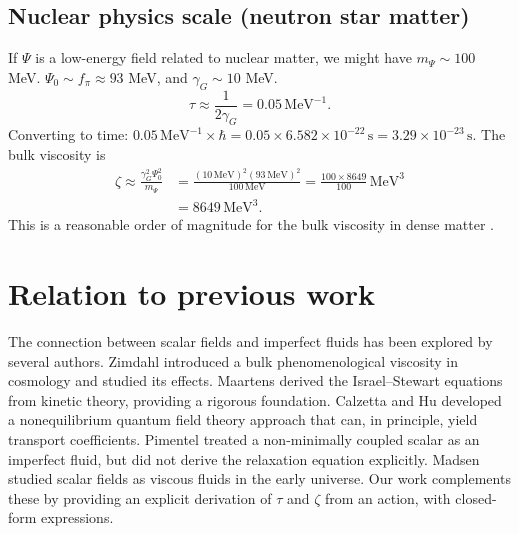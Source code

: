 \documentclass[aps,prd,reprint,superscriptaddress,floatfix]{revtex4-2}
\begin{document}
\subsection{Nuclear physics scale (neutron star matter)}
If $\Psi$ is a low-energy field related to nuclear matter, we might have $m_\Psi \sim 100$ MeV. $\Psi_0 \sim f_\pi \approx 93$ MeV, and $\gamma_G \sim 10$ MeV.
\begin{equation}
\tau \approx \frac{1}{2\gamma_G} = 0.05\,\mathrm{MeV}^{-1}.
\end{equation}
Converting to time: $0.05\,\mathrm{MeV}^{-1} \times \hbar = 0.05 \times 6.582\times10^{-22}\,\mathrm{s} = 3.29\times10^{-23}\,\mathrm{s}$.
The bulk viscosity is
\begin{equation}
\begin{split}
\zeta \approx \frac{\gamma_G^2 \Psi_0^2}{m_\Psi} &= \frac{(10\,\mathrm{MeV})^2 (93\,\mathrm{MeV})^2}{100\,\mathrm{MeV}} = \frac{100 \times 8649}{100}\,\mathrm{MeV}^3 \\
&= 8649\,\mathrm{MeV}^3.
\end{split}
\end{equation}
This is a reasonable order of magnitude for the bulk viscosity in dense matter \cite{Alford}.

\section{Relation to previous work}
\label{sec:literature}

The connection between scalar fields and imperfect fluids has been explored by several authors. Zimdahl \cite{Zimdahl} introduced a bulk phenomenological viscosity in cosmology and studied its effects. Maartens \cite{Maartens} derived the Israel--Stewart equations from kinetic theory, providing a rigorous foundation. Calzetta and Hu \cite{CalzettaHu} developed a nonequilibrium quantum field theory approach that can, in principle, yield transport coefficients. Pimentel \cite{Pimentel} treated a non-minimally coupled scalar as an imperfect fluid, but did not derive the relaxation equation explicitly. Madsen \cite{Madsen1988} studied scalar fields as viscous fluids in the early universe. Our work complements these by providing an explicit derivation of $\tau$ and $\zeta$ from an action, with closed-form expressions.
\end{document}

